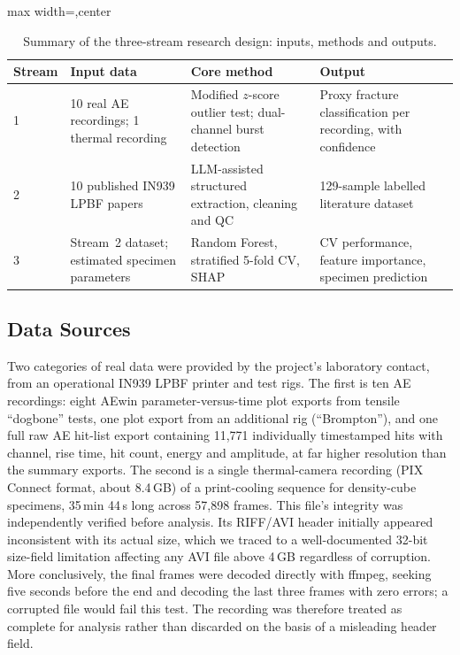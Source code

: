 \documentclass[a4paper]{article}
\newcommand{\sz}[1]{\fpeval{#1*\bodysize/14}}     %
\renewcommand{\small}{\fontsize{\sz{11.7}}{\sz{15.6}}\selectfont}
\begin{document}
\begin{table}[t]
\centering
\small
\begin{adjustbox}{max width=\textwidth,center}
\begin{tabular}{p{1.3cm}p{3.4cm}p{4.4cm}p{3.4cm}}
\toprule
Stream & Input data & Core method & Output \\
\midrule
1 & 10 real AE recordings; 1 thermal recording & Modified $z$-score outlier test; dual-channel burst detection & Proxy fracture classification per recording, with confidence \\
2 & 10 published IN939 LPBF papers & LLM-assisted structured extraction, cleaning and QC & 129-sample labelled literature dataset \\
3 & Stream~2 dataset; estimated specimen parameters & Random Forest, stratified 5-fold CV, SHAP & CV performance, feature importance, specimen prediction \\
\bottomrule
\end{tabular}
\end{adjustbox}
\caption{Summary of the three-stream research design: inputs, methods and outputs.}
\label{tab:streams}
\end{table}

\subsection{Data Sources}
Two categories of real data were provided by the project's laboratory contact, from an operational IN939 LPBF printer and test rigs. The first is ten AE recordings: eight AEwin parameter-versus-time plot exports from tensile ``dogbone'' tests, one plot export from an additional rig (``Brompton''), and one full raw AE hit-list export containing 11,771 individually timestamped hits with channel, rise time, hit count, energy and amplitude, at far higher resolution than the summary exports. The second is a single thermal-camera recording (PIX Connect format, about 8.4\,GB) of a print-cooling sequence for density-cube specimens, 35\,min 44\,s long across 57,898 frames. This file's integrity was independently verified before analysis. Its RIFF/AVI header initially appeared inconsistent with its actual size, which we traced to a well-documented 32-bit size-field limitation affecting any AVI file above 4\,GB regardless of corruption. More conclusively, the final frames were decoded directly with ffmpeg, seeking five seconds before the end and decoding the last three frames with zero errors; a corrupted file would fail this test. The recording was therefore treated as complete for analysis rather than discarded on the basis of a misleading header field.
\end{document}
